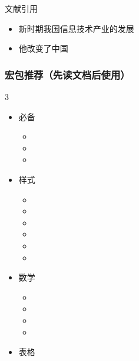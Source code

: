 \begin{frame}[fragile]{文献引用}
  \begin{itemize}
    \item 新时期我国信息技术产业的发展 \cite{devoftech}
    \item 他改变了中国 \cite{thelegendofjiang}
  \end{itemize}
\end{frame}

\begin{frame}[fragile]
  \frametitle{宏包推荐（先读文档后使用）}
  \vspace{-1.5em}
  \scriptsize
  \begin{multicols}{3}
    \begin{itemize}
      \item 必备

            \begin{itemize}
              \item {}
              \item {}
              \item {}
            \end{itemize}

      \item 样式

            \begin{itemize}
              \item {}
              \item {}
              \item {}
              \item {}
              \item {}
              \item {}
            \end{itemize}

      \item 数学

            \begin{itemize}
              \item {}
              \item {}
              \item {}
              \item {}
            \end{itemize}

      \item 表格


\end{itemize}
\end{multicols}
\end{frame}
